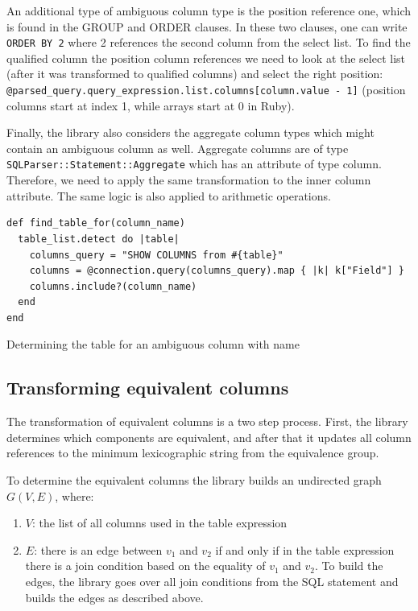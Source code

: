 An additional type of ambiguous column type is the position reference one, which is found in the GROUP and ORDER clauses. In these two clauses, one can write \texttt{ORDER BY 2} where 2 references the second column from the select list. To find the qualified column the position column references we need to look at the select list (after it was transformed to qualified columns) and select the right position: \texttt{@parsed_query.query_expression.list.columns[column.value - 1]} (position columns start at index 1, while arrays start at 0 in Ruby).

Finally, the library also considers the aggregate column types which might contain an ambiguous column as well. Aggregate columns are of type \texttt{SQLParser::Statement::Aggregate} which has an attribute of type column. Therefore, we need to apply the same transformation to the inner column attribute. The same logic is also applied to arithmetic operations.

\begin{code}
\begin{verbatim}
def find_table_for(column_name)
  table_list.detect do |table|
    columns_query = "SHOW COLUMNS from #{table}"
    columns = @connection.query(columns_query).map { |k| k["Field"] }
    columns.include?(column_name)
  end
end
\end{verbatim}
\caption{Determining the table for an ambiguous column with name}
\label{fig:find_table}
\end{code}


\subsection{Transforming equivalent columns}

The transformation of equivalent columns is a two step process. First, the library determines which components are equivalent, and after that it updates all column references to the minimum lexicographic string from the equivalence group.

To determine the equivalent columns the library builds an undirected graph $G(V, E)$, where:
\begin{enumerate}
    \item $V$: the list of all columns used in the table expression
    \item $E$: there is an edge between $v_1$ and $v_2$ if and only if in the table expression there is a join condition based on the equality of $v_1$ and $v_2$. To build the edges, the library goes over all join conditions from the SQL statement and builds the edges as described above.
\end{enumerate}

